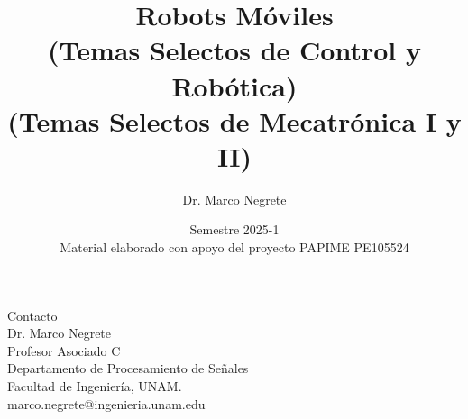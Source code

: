 \documentclass[10pt,spanish,aspectratio=1610]{beamer}
\begin{document}
\renewcommand{\tablename}{Tabla}
\renewcommand{\figurename}{Figura}

\title[Robots Móviles 2025-2]{Robots Móviles\\(Temas Selectos de Control y Robótica)\\(Temas Selectos de Mecatrónica I y II)}
\author[Dr. Marco Negrete]{Dr. Marco Negrete}
\date[2025-1]{Semestre 2025-1\\Material elaborado con apoyo del proyecto PAPIME PE105524}

\begin{frame}
\titlepage
\end{frame}











\begin{frame}
  \Large{Contacto}
  \[\]
  \large
  Dr. Marco Negrete\\
  Profesor Asociado C\\
  Departamento de Procesamiento de Señales\\
  Facultad de Ingeniería, UNAM.
  \[\]
  marco.negrete@ingenieria.unam.edu\\
\end{frame}
\end{document}
